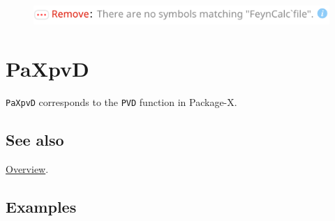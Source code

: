 \documentclass[../FeynHelpersManual.tex]{subfiles}
\begin{document}
\FloatBarrier
\begin{figure}[!ht]
\centering
\includegraphics[width=0.6\linewidth]{img/1p1tg4rvundxc.pdf}
\end{figure}
\FloatBarrier

\begin{Shaded}
\begin{Highlighting}[]
 
\end{Highlighting}
\end{Shaded}

\hypertarget{paxpvd}{
\section{PaXpvD}\label{paxpvd}}

\texttt{PaXpvD} corresponds to the \texttt{PVD} function in Package-X.

\subsection{See also}

\hyperlink{toc}{Overview}.

\subsection{Examples}
\end{document}
